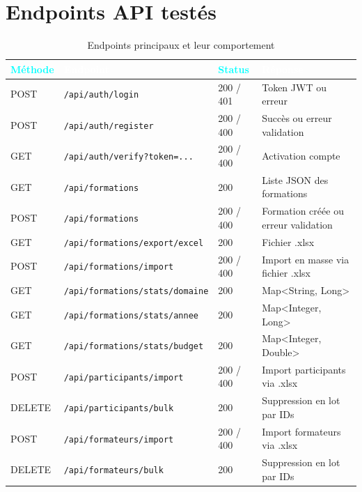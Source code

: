 \documentclass[12pt,a4paper]{report}
\begin{document}
\section{Endpoints API test\'{e}s}

\begin{table}[H]
\centering
\caption{Endpoints principaux et leur comportement}
\small
\begin{tabularx}{\textwidth}{|C{1.5cm}|X|C{1.8cm}|L{4cm}|}
\hline
{}
\textcolor{cyan}{\textbf{M\'{e}thode}} & \textcolor{white}{\textbf{Endpoint}} &
\textcolor{cyan}{\textbf{Status}} & \textcolor{white}{\textbf{R\'{e}ponse}} \\
\hline
POST & \texttt{/api/auth/login} & 200 / 401 & Token JWT ou erreur \\
\hline
POST & \texttt{/api/auth/register} & 200 / 400 & Succ\`{e}s ou erreur validation \\
\hline
GET & \texttt{/api/auth/verify?token=...} & 200 / 400 & Activation compte \\
\hline
GET & \texttt{/api/formations} & 200 & Liste JSON des formations \\
\hline
POST & \texttt{/api/formations} & 200 / 400 & Formation cr\'{e}\'{e}e ou erreur validation \\
\hline
GET & \texttt{/api/formations/export/excel} & 200 & Fichier .xlsx \\
\hline
POST & \texttt{/api/formations/import} & 200 / 400 & Import en masse via fichier .xlsx \\
\hline
GET & \texttt{/api/formations/stats/domaine} & 200 & Map\textless String, Long\textgreater{} \\
\hline
GET & \texttt{/api/formations/stats/annee} & 200 & Map\textless Integer, Long\textgreater{} \\
\hline
GET & \texttt{/api/formations/stats/budget} & 200 & Map\textless Integer, Double\textgreater{} \\
\hline
POST & \texttt{/api/participants/import} & 200 / 400 & Import participants via .xlsx \\
\hline
DELETE & \texttt{/api/participants/bulk} & 200 & Suppression en lot par IDs \\
\hline
POST & \texttt{/api/formateurs/import} & 200 / 400 & Import formateurs via .xlsx \\
\hline
DELETE & \texttt{/api/formateurs/bulk} & 200 & Suppression en lot par IDs \\
\hline
\end{tabularx}
\end{table}
\end{document}

